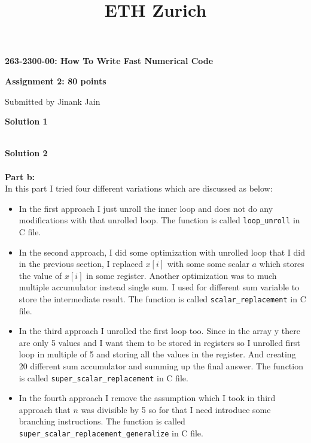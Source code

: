 \documentclass[letterpaper, 11pt]{article}
\title{ETH Zurich}
\begin{document}

\begin{center}
\Large \bf 263-2300-00: How To Write Fast Numerical Code

\Large \bf Assignment 2: 80 points

\large Submitted by Jinank Jain
\end{center}

\textbf{Solution 1}\\ \\
\bigskip

\textbf{Solution 2}\\ \\
\textbf{Part b:} \\
In this part I tried four different variations which are discussed as below:
\begin{itemize}
	\item In the first approach I just unroll the inner loop and does not do any modifications with that unrolled loop. The function is called \texttt{loop\_unroll} in C file.
	\item In the second approach, I did some optimization with unrolled loop that I did in the previous section, I replaced $x[i]$ with some some scalar $a$ which stores the value of $x[i]$ in some register. Another optimization was to much multiple accumulator instead single sum. I used for different sum variable to store the intermediate result. The function is called \texttt{scalar\_replacement} in C file.
	\item In the third approach I unrolled the first loop too. Since in the array y there are only 5 values and I want them to be stored in registers so I unrolled first loop in multiple of 5 and storing all the values in the register. And creating 20 different sum accumulator and summing up the final answer. The function is called \texttt{super\_scalar\_replacement} in C file.
	\item In the fourth approach I remove the assumption which I took in third approach that $n$ was divisible by 5 so for that I need introduce some branching instructions. The function is called \texttt{super\_scalar\_replacement\_generalize} in C file.
\end{itemize}
\end{document}
